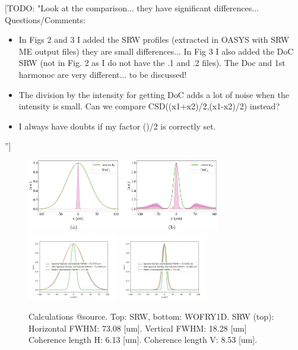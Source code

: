 \documentclass{iucr}              %
\newcommand{\todo}[1]{{\color{red}[TODO: "#1'']}}
\begin{document}
\todo{Look at the comparison... they have significant differences... Questions/Comments: 
\begin{itemize}
    \item  In Figs 2 and 3 I added the SRW profiles (extracted in OASYS with SRW ME output files) they are small differences... In Fig 3 I also added the DoC SRW (not in Fig. 2 as I do not have the .1 and .2 files). The Doc and 1st harmonoc are very different... to be discussed! 
    \item The division by the intensity for getting DoC adds a lot of noise when the intensity is small. Can we compare CSD((x1+x2)/2,(x1-x2)/2) instead? 
    \item I always have doubts if my factor ()/2 is correctly set.
\end{itemize}
}


\newpage
\onecolumn
\begin{figure}
    \label{fig:CSD_SRW_vs_I_source}
    \includegraphics[width=0.75\textwidth]{CSD_SRW_vs_I_source.pdf}
    \includegraphics[width=0.35\textwidth]{figures/CSD_WOFRY1D_vs_I_source_h.png}
    \includegraphics[width=0.35\textwidth]{figures/CSD_WOFRY1D_vs_I_source_v.png}
    \caption{Calculations @source. Top: SRW, bottom: WOFRY1D.
SRW (top): Horizontal FWHM: 73.08 [um]. 
Vertical FWHM: 18.28 [um]
Coherence length H: 6.13 [um]. 
Coherence length V: 8.53 [um].
    }
\end{figure}
\end{document}
